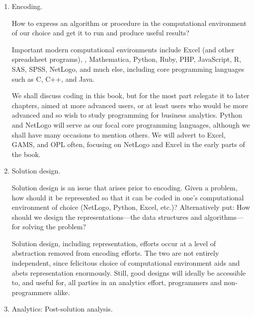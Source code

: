 \begin{enumerate}
\item Encoding.

How to express an algorithm or procedure in the computational environment of our choice and get it to run and produce useful results?

Important modern computational environments include Excel (and other spreadsheet programs), \mlb , Mathematica, Python, Ruby, PHP, JavaScript, R, SAS, SPSS, NetLogo, and much else, including core programming languages such as C, C++, and Java.

We shall discuss coding in this book, but for the most part relegate it to later chapters, aimed at more advanced users, or at least users who would be more advanced and so wish to study programming for business analytics. Python and NetLogo will serve as our focal core programming languages, although we shall have many occasions to mention others. We will advert to Excel, GAMS, and OPL often, focusing on NetLogo and Excel in the early parts of the book.


\item Solution design.

Solution design is an issue that arises prior to encoding. Given a problem, how should it be represented so that  it  can be coded in one's computational environment of choice (NetLogo, Python, Excel, etc.)? Alternatively put:
 How should we  design the representations---the data structures and algorithms---for solving the problem?
 
 Solution design, including representation, efforts occur at a level of abstraction removed from encoding efforts. The two are not entirely independent, since felicitous choice of computational environment aids and abets representation enormously. Still, good designs will ideally be accessible to, and useful for, all parties in an analytics effort, programmers and non-programmers alike.
 
 \item Analytics: Post-solution analysis.
 

\end{enumerate}
